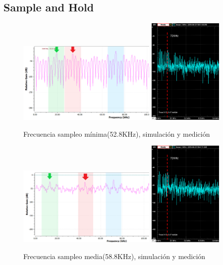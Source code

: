 \documentclass[../../ASSD_TP1_G7.tex]{subfiles}
\begin{document}
\subsection*{Sample and Hold}
\begin{figure}[H]
\centering
{}
{\includegraphics[width=0.6\textwidth]{figures/simpto_8_syh_52,8_espectro.png}}
{\includegraphics[width=0.32\textwidth]{figures/pto_8_syh_52,8_espectro.png}}
\caption{Frecuencia sampleo mínima(52.8KHz), simulación y medición}
\label{fig:subnyq_syh_fmin}
\end{figure}

\begin{figure}[H]
\centering
{}
{\includegraphics[width=0.6\textwidth]{figures/simpto_8_syh_58,8_espectro.png}}
{\includegraphics[width=0.32\textwidth]{figures/pto_8_syh_58,8_espectro.png}}
\caption{Frecuencia sampleo media(58.8KHz), simulación y medición}
\label{fig:subnyq_syh_fmed}
\end{figure}
\end{document}
